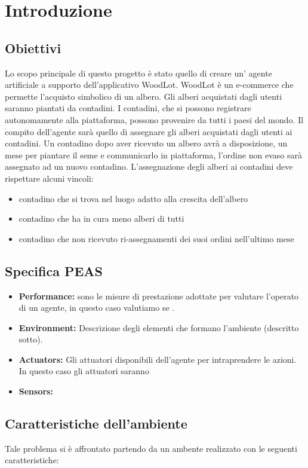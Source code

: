 \section{Introduzione}

\subsection{Obiettivi}
Lo scopo principale di questo progetto è stato quello di creare un' agente artificiale a supporto dell'applicativo WoodLot.
WoodLot è un e-commerce che permette l'acquisto simbolico di un albero. Gli alberi acquistati dagli utenti saranno piantati da contadini. I contadini, che si possono registrare autonomamente alla piattaforma, possono provenire da tutti i paesi del mondo.
Il compito dell'agente sarà quello di assegnare gli alberi acquistati dagli utenti ai contadini. 
Un contadino dopo aver ricevuto un albero avrà a disposizione, un mese per piantare il seme e communicarlo in piattaforma, l'ordine non evaso sarà assegnato ad un nuovo contadino.
L'assegnazione degli alberi ai contadini deve rispettare alcuni vincoli: 
\begin{itemize}
\item contadino che si trova nel luogo adatto alla crescita dell'albero
\item contadino che ha in cura meno alberi di tutti 
\item contadino che non ricevuto ri-assegnamenti dei suoi ordini nell'ultimo mese
\end{itemize}



\subsection{Specifica PEAS}
\begin{itemize}
\item \textbf{Performance:} sono le misure di prestazione adottate per valutare l’operato di un agente,
in questo caso valutiamo se .
\item \textbf{Environment:} Descrizione degli elementi che formano l’ambiente (descritto sotto).
\item \textbf{Actuators:} Gli attuatori disponibili dell’agente per intraprendere le azioni. In questo caso gli attuatori saranno 
\item \textbf{Sensors:} 
\end{itemize}

\subsection{Caratteristiche dell'ambiente}
Tale problema si è affrontato partendo da un ambente realizzato con le seguenti caratteristiche: 

